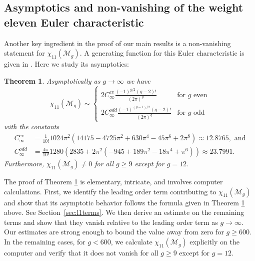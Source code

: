 \documentclass[12pt]{amsart}
\newtheorem{thm}{Theorem}[section]
\theoremstyle{definition}
\numberwithin{equation}{section}
\newcommand{\M}{\mathcal{M}}
\theoremstyle{definition} %
\theoremstyle{remark}
\begin{document}
\subsection{Asymptotics and non-vanishing of the weight eleven Euler characteristic}
Another key ingredient in the proof of our main results is a non-vanishing statement for $\chi_{11}(\M_g)$.
A generating function for this Euler characteristic is given in \cite[Theorem~7.1]{PayneWillwacher24}. Here we study its asymptotics:
\begin{thm}
\label{thm:wt11 intro}
    Asymptotically as $g\to \infty$ we have
\[
\chi_{11}(\M_g)
\sim 
\begin{cases}
    2 C_\infty^{ev} \frac{(-1)^{g/2} (g-2)! }{(2\pi)^g } & \text{for $g$ even} \\
    2 C_\infty^{odd} \frac{(-1)^{(g-1)/2} (g-2)! }{(2\pi)^{g} }
     & \text{for $g$ odd} 
\end{cases}
\]
with the constants
\begin{align*}
    C_\infty^{ev}
    &=
    \frac{1}{10!} 1024 \pi^2 (14175 - 4725 \pi^2 + 630 \pi^4 - 45 \pi^6 + 
       2 \pi^8)  \approx 12.8765, \mbox{ and}
\\
C_{\infty}^{odd}
    &
    =\frac{4\pi}{10!}
    1280 (2835 + 2 \pi^2 (-945 + 189 \pi^2 - 18 \pi^4 + \pi^6)) 
    \approx 
    23.7991.
\end{align*}
Furthermore, $\chi_{11}(\M_g)\neq 0$ for all $g\geq 9$ except for $g=12$.
\end{thm}

\noindent The proof of Theorem \ref{thm:wt11 intro} is elementary, intricate, and involves computer calculations. First, we identify the leading order term contributing to $\chi_{11}(\M_g)$ and show that its asymptotic behavior follows the formula given in Theorem \ref{thm:wt11 intro} above. See Section~\ref{sec:l1terms}. We then derive an estimate on the remaining terms and show that they vanish relative to the leading order term as $g\to \infty$. Our estimates are strong enough to bound the value away from zero for $g\geq 600$. In the remaining cases, for $ g< 600$, we calculate $\chi_{11}(\M_g)$ explicitly on the computer and verify that it does not vanish for all $g \geq 9$ except for $g = 12$.
\end{document}
